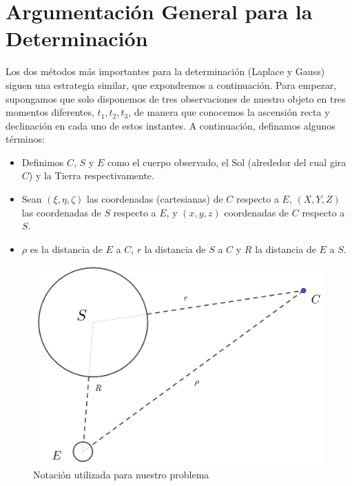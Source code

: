 \documentclass[11pt]{book}
\begin{document}
\section{Argumentación General para la Determinación}
Los dos métodos más importantes para la determinación (Laplace y Gauss) siguen una estrategia similar, que expondremos a continuación. Para empezar, supongamos que solo disponemos de tres observaciones de nuestro objeto en tres momentos diferentes, $t_1, t_2, t_3$, de manera que conocemos la ascensión recta y declinación en cada uno de estos instantes. A continuación, definamos algunos términos:
\begin{itemize}
\item Definimos $C$, $S$ y $E$ como el cuerpo observado, el Sol (alrededor del cual gira $C$) y la Tierra respectivamente.
\item Sean $(\xi,\eta,\zeta)$ las coordenadas (cartesianas) de $C$ respecto a $E$, $(X,Y,Z)$ las coordenadas de $S$ respecto a $E$, y $(x,y,z)$ coordenadas de $C$ respecto a $S$.
\item $\rho$ es la distancia de $E$ a $C$, $r$ la distancia de $S$ a $C$ y $R$ la distancia de $E$ a $S$.
\end{itemize}

\begin{figure}[H]
\centering
\includegraphics[scale=0.15]{images/notation.png}
\caption{Notación utilizada para nuestro problema}
\label{fig:notation}
\end{figure}
\end{document}
